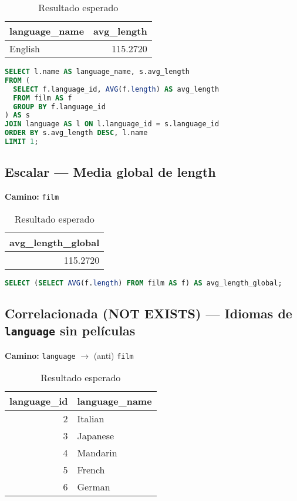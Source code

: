\documentclass[12pt,a4paper]{article}
\begin{document}
\begin{table}[h]
\centering
\caption{Resultado esperado}
\begin{tabular}{@{}l r@{}}
\toprule
\textbf{language\_name} & \textbf{avg\_length} \\
\midrule
English & 115.2720 \\
\bottomrule
\end{tabular}
\end{table}

\begin{lstlisting}[language=SQL]
SELECT l.name AS language_name, s.avg_length
FROM (
  SELECT f.language_id, AVG(f.length) AS avg_length
  FROM film AS f
  GROUP BY f.language_id
) AS s
JOIN language AS l ON l.language_id = s.language_id
ORDER BY s.avg_length DESC, l.name
LIMIT 1;
\end{lstlisting}

\subsection{Escalar — Media global de length}
\textbf{Camino:} \texttt{film}

\begin{table}[h]
\centering
\caption{Resultado esperado}
\begin{tabular}{@{}r@{}}
\toprule
\textbf{avg\_length\_global} \\
\midrule
115.2720 \\
\bottomrule
\end{tabular}
\end{table}

\begin{lstlisting}[language=SQL]
SELECT (SELECT AVG(f.length) FROM film AS f) AS avg_length_global;
\end{lstlisting}

\subsection{Correlacionada (NOT EXISTS) — Idiomas de \texttt{language} sin películas}
\textbf{Camino:} \texttt{language} $\rightarrow$ (anti) \texttt{film}

\begin{table}[h]
\centering
\caption{Resultado esperado}
\begin{tabular}{@{}r l@{}}
\toprule
\textbf{language\_id} & \textbf{language\_name} \\
\midrule
2 & Italian \\
3 & Japanese \\
4 & Mandarin \\
5 & French \\
6 & German \\
\bottomrule
\end{tabular}
\end{table}
\end{document}

